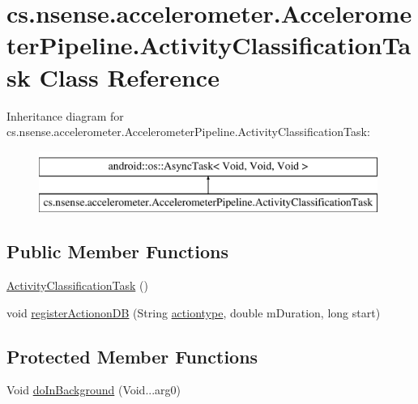 \hypertarget{classcs_1_1nsense_1_1accelerometer_1_1_accelerometer_pipeline_1_1_activity_classification_task}{\section{cs.\-nsense.\-accelerometer.\-Accelerometer\-Pipeline.\-Activity\-Classification\-Task Class Reference}
\label{classcs_1_1nsense_1_1accelerometer_1_1_accelerometer_pipeline_1_1_activity_classification_task}
}
Inheritance diagram for cs.\-nsense.\-accelerometer.\-Accelerometer\-Pipeline.\-Activity\-Classification\-Task\-:\begin{figure}[H]
\begin{center}
\leavevmode
\includegraphics[height=2.000000cm]{classcs_1_1nsense_1_1accelerometer_1_1_accelerometer_pipeline_1_1_activity_classification_task}
\end{center}
\end{figure}
\subsection*{Public Member Functions}
\begin{DoxyCompactItemize}
\item 
\hyperlink{classcs_1_1nsense_1_1accelerometer_1_1_accelerometer_pipeline_1_1_activity_classification_task_a4525750337e185a1c65e5d19623c775c}{Activity\-Classification\-Task} ()
\item 
void \hyperlink{classcs_1_1nsense_1_1accelerometer_1_1_accelerometer_pipeline_1_1_activity_classification_task_a0f75b218f422ecc03ddd0befef1741ca}{register\-Actionon\-D\-B} (String \hyperlink{classcs_1_1nsense_1_1accelerometer_1_1_accelerometer_pipeline_a95d30b2dc5307bc407e4766cd809f525}{actiontype}, double m\-Duration, long start)
\end{DoxyCompactItemize}
\subsection*{Protected Member Functions}
\begin{DoxyCompactItemize}
\item 
Void \hyperlink{classcs_1_1nsense_1_1accelerometer_1_1_accelerometer_pipeline_1_1_activity_classification_task_a70116f7709cf475c0b339c61cc990957}{do\-In\-Background} (Void...\-arg0)
\end{DoxyCompactItemize}
